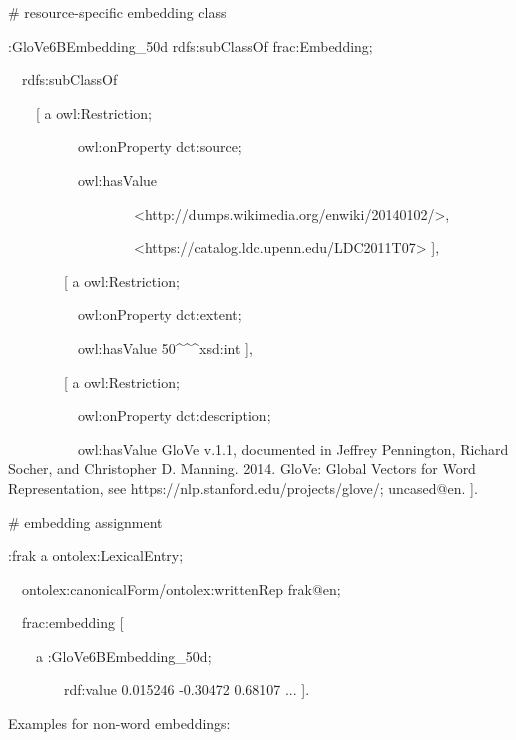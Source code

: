 \documentclass[a4paper]{article}
\newcommand\textstyleSourceText[1]{\textrm{#1}}
\begin{document}
\bigskip

\textstyleSourceText{\# resource-specific embedding class}

\textstyleSourceText{:GloVe6BEmbedding\_50d rdfs:subClassOf frac:Embedding;}

\textstyleSourceText{\ \ rdfs:subClassOf }

\textstyleSourceText{\ \ \ \ [ a owl:Restriction;}

\textstyleSourceText{\ \ \ \ \ \ \ \ \ \ owl:onProperty dct:source;}

\textstyleSourceText{\ \ \ \ \ \ \ \ \ \ owl:hasValue }

\textstyleSourceText{\ \ \ \ \ \ \ \ \ \ \ \ \ \ \ \ \ \ {\textless}http://dumps.wikimedia.org/enwiki/20140102/{\textgreater},}

\textstyleSourceText{\ \ \ \ \ \ \ \ \ \ \ \ \ \ \ \ \ \ {\textless}https://catalog.ldc.upenn.edu/LDC2011T07{\textgreater} ],}

\textstyleSourceText{\ \ \ \ \ \ \ \ [ a owl:Restriction;}

\textstyleSourceText{\ \ \ \ \ \ \ \ \ \ owl:onProperty dct:extent;}

\textstyleSourceText{\ \ \ \ \ \ \ \ \ \ owl:hasValue 50\^{}\^{}\^{}xsd:int ],}

\textstyleSourceText{\ \ \ \ \ \ \ \ [ a owl:Restriction;}

\textstyleSourceText{\ \ \ \ \ \ \ \ \ \ owl:onProperty dct:description;}

\textstyleSourceText{\ \ \ \ \ \ \ \ \ \ owl:hasValue {\textquotedbl}GloVe v.1.1, documented in Jeffrey Pennington, Richard Socher, and Christopher D. Manning. 2014. GloVe: Global Vectors for Word Representation, see https://nlp.stanford.edu/projects/glove/; uncased{\textquotedbl}@en. ].}


\bigskip

\textstyleSourceText{\# embedding assignment}

\textstyleSourceText{:frak a ontolex:LexicalEntry;}

\textstyleSourceText{\ \ ontolex:canonicalForm/ontolex:writtenRep {\textquotedbl}frak{\textquotedbl}@en;}

\textstyleSourceText{\ \ frac:embedding [ }

\textstyleSourceText{\ \ \ \ a :GloVe6BEmbedding\_50d;}

\textstyleSourceText{\ \ \ \ \ \ \ \ rdf:value {\textquotedbl}0.015246 -0.30472 0.68107 ...{\textquotedbl} ].}

Examples for non-word embeddings: 
\end{document}
